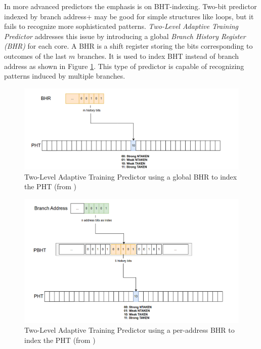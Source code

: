 In more advanced predictors the emphasis is on BHT-indexing. Two-bit predictor indexed by branch address+ may be good for simple structures like loops, but it fails to recognize more sophisticated patterns. \textit{Two-Level Adaptive Training Predictor} addresses this issue by introducing a global \textit{Branch History Register (BHR)} for each core. A BHR is a shift register storing the bits corresponding to outcomes of the last $m$ branches. It is used to index BHT instead of branch address as shown in Figure \ref{fig:bp-two-level}. This type of predictor is capable of recognizing patterns induced by multiple branches.

\begin{figure}
    \includegraphics[width=\textwidth]{figures/bp-two-level.png}
    \caption{Two-Level Adaptive Training Predictor using a global BHR to index the PHT (from \cite{mahling_reverse_2023})}
    \label{fig:bp-two-level}
\end{figure}

\begin{figure}
    \includegraphics[width=\textwidth]{figures/bp-two-level-local.png}
    \caption{Two-Level Adaptive Training Predictor using a per-address BHR to index the PHT (from \cite{mahling_reverse_2023})}
    \label{fig:bp-two-level-local}
\end{figure}

